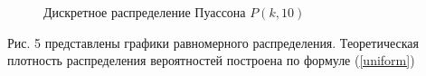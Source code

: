\documentclass[12pt]{article}
\newcommand{\lskip}{\hfill\break}
\begin{document}
\begin{flushleft}
\begin{figure}[h!]
        \begin{minipage}[h]{0.325\linewidth}
        \end{minipage}
        \caption{Дискретное распределение Пуассона $P(k, 10)$}
    \end{figure}
    \lskip

     Рис. 5 представлены графики равномерного распределения. Теоретическая плотность распределения вероятностей построена по формуле (\ref{uniform})


\end{flushleft}
\end{document}
